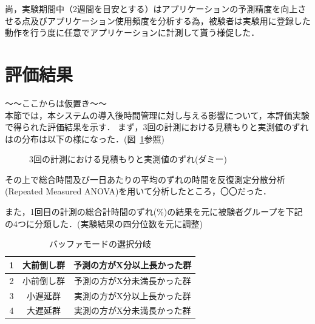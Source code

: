 尚，実験期間中（2週間を目安とする）はアプリケーションの予測精度を向上させる点及びアプリケーション使用頻度を分析する為，被験者は実験用に登録した動作を行う度に任意でアプリケーションに計測して貰う様促した．

\section{評価結果}
〜〜ここからは仮置き〜〜\\
本節では，本システムの導入後時間管理に対し与える影響について，本評価実験で得られた評価結果を示す．
まず，3回の計測における見積もりと実測値のずれはの分布は以下の様になった．(図~\ref{fig:hakohige}参照)

\begin{figure}[hb]
	\begin{center}
	\caption{3回の計測における見積もりと実測値のずれ(ダミー)}
	\label{fig:hakohige}
	\end{center}
\end{figure}

その上で総合時間及び一日あたりの平均のずれの時間を反復測定分散分析(Repeated Measured ANOVA)を用いて分析したところ，〇〇だった．

また，1回目の計測の総合計時間のずれ(\%)の結果を元に被験者グループを下記の4つに分類した．(実験結果の四分位数を元に調整)

\begin{table}[htb]
  \begin{center}
  \begin{tabular}{|c|c|c|} \hline
    1 & 大前倒し群 & 予測の方がX分以上長かった群  \\ \hline
    2 & 小前倒し群 & 予測の方がX分未満長かった群  \\ \hline
    3 & 小遅延群 & 実測の方がX分以上長かった群  \\ \hline
    4 & 大遅延群 & 実測の方がX分未満長かった群  \\ \hline 
  \end{tabular}
    \caption{バッファモードの選択分岐}
    \label{tb:buffer}
  \end{center}
\end{table}

